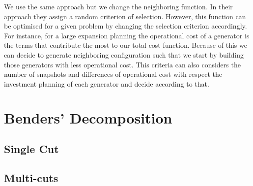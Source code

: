 We use the same approach but we change the neighboring function. In their approach they assign a random criterion of selection. However, this function can be optimised for a given problem by changing the selection criterion accordingly. For instance, for a large expansion planning the operational cost of a generator is the terms that contribute the most to our total cost function. Because of this we can decide to generate neighboring configuration such that we start by building those generators with less operational cost. This criteria can also considers the number of snapshots and differences of operational cost with respect the investment planning of each generator and decide according to that. 
\section{Benders' Decomposition}
\subsection{Single Cut}
\subsection{Multi-cuts}

\newcommand{\keyword}[1]{\textbf{#1}}
\newcommand{\tabhead}[1]{\textbf{#1}}
\newcommand{\code}[1]{\texttt{#1}}
\newcommand{\file}[1]{\texttt{\bfseries#1}}
\newcommand{\option}[1]{\texttt{\itshape#1}}




